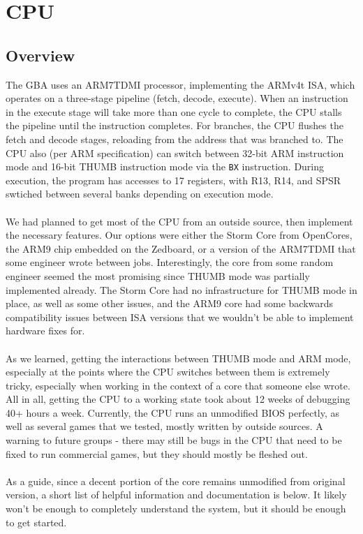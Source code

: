 \documentclass[11pt,a4paper]{article}
\begin{document}
	\section{CPU}
	\subsection{Overview}
	The GBA uses an ARM7TDMI processor, implementing the ARMv4t ISA, which operates on a three-stage pipeline (fetch, decode, execute). When an instruction in the execute stage will take more than one cycle to complete, the CPU stalls the pipeline until the instruction completes. For branches, the CPU flushes the fetch and decode stages, reloading from the address that was branched to. The CPU also (per ARM specification) can switch between 32-bit ARM instruction mode and 16-bit THUMB instruction mode via the \texttt{BX} instruction. During execution, the program has accesses to 17 registers, with R13, R14, and SPSR swtiched between several banks depending on execution mode.\\\\
	We had planned to get most of the CPU from an outside source, then implement the necessary features. Our options were either the Storm Core from OpenCores, the ARM9 chip embedded on the Zedboard, or a version of the ARM7TDMI that some engineer wrote between jobs. Interestingly, the core from some random engineer seemed the most promising since THUMB mode was partially implemented already. The Storm Core had no infrastructure for THUMB mode in place, as well as some other issues, and the ARM9 core had some backwards compatibility issues between ISA versions that we wouldn't be able to implement hardware fixes for.\\\\
	As we learned, getting the interactions between THUMB mode and ARM mode, especially at the points where the CPU switches between them is extremely tricky, especially when working in the context of a core that someone else wrote. All in all, getting the CPU to a working state took about 12 weeks of debugging 40+ hours a week. Currently, the CPU runs an unmodified BIOS perfectly, as well as several games that we tested, mostly written by outside sources. A warning to future groups - there may still be bugs in the CPU that need to be fixed to run commercial games, but they should mostly be fleshed out.\\\\
	As a guide, since a decent portion of the core remains unmodified from original version, a short list of helpful information and documentation is below. It likely won't be enough to completely understand the system, but it should be enough to get started.\\\\
\end{document}
